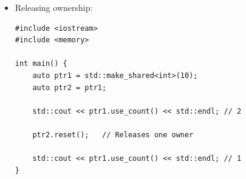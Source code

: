 \documentclass[10pt]{article}
\begin{document}
\begin{itemize}
\begin{verbatim}
void printValue(std::shared_ptr<int> p) {
    std::cout << *p << std::endl;
    std::cout << p.use_count() << std::endl;
}

int main() {
    auto ptr = std::make_shared<int>(100);

    std::cout << ptr.use_count() << std::endl; // 1

    printValue(ptr);   // Copies the shared_ptr

    std::cout << ptr.use_count() << std::endl; // 1
}
\end{verbatim}

    \item Releasing ownership:

\begin{verbatim}
#include <iostream>
#include <memory>

int main() {
    auto ptr1 = std::make_shared<int>(10);
    auto ptr2 = ptr1;

    std::cout << ptr1.use_count() << std::endl; // 2

    ptr2.reset();   // Releases one owner

    std::cout << ptr1.use_count() << std::endl; // 1
}
\end{verbatim}

\end{itemize}

\newpage
\end{document}
